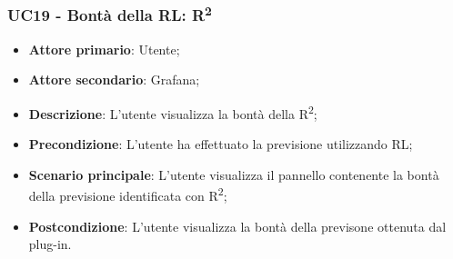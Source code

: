 \subsubsection{UC19 - Bontà della RL: R\textsuperscript{2}}
\label{sssec:uc19}
\begin{itemize}
  \item \textbf{Attore primario}: Utente;
  \item \textbf{Attore secondario}: Grafana;
  \item \textbf{Descrizione}: L'utente visualizza la bontà della R\textsuperscript{2};
  \item \textbf{Precondizione}: L'utente ha effettuato la previsione utilizzando RL;
  \item \textbf{Scenario principale}: L'utente visualizza il pannello contenente la bontà della previsione identificata con R\textsuperscript{2};
  \item \textbf{Postcondizione}: L'utente visualizza la bontà della previsone ottenuta dal plug-in.
\end{itemize}
